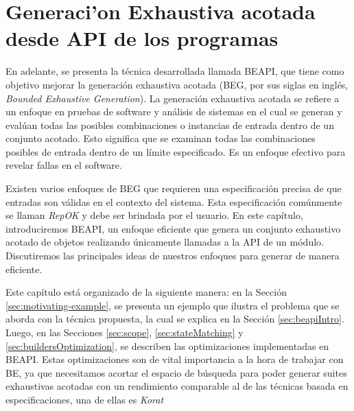 \chapter{Generaci'on Exhaustiva acotada desde API de los programas}
\label{cap:beapi}

En adelante, se presenta la técnica desarrollada llamada BEAPI, que tiene como
objetivo mejorar la generación exhaustiva acotada (BEG, por sus siglas en
inglés, \emph{Bounded Exhaustive Generation}).  
La generación exhaustiva acotada se refiere a un enfoque en pruebas de software
y análisis de sistemas en el cual se generan y evalúan todas las posibles combinaciones o instancias de entrada dentro de un conjunto acotado. 
Esto significa que se examinan todas las combinaciones posibles de entrada dentro de un límite especificado. 
Es un enfoque efectivo para revelar fallas en el software. 

Existen varios enfoques de BEG que requieren una especificación precisa de que entradas son válidas en el contexto del sistema. 
Esta especificación comúnmente se llaman \emph{RepOK} y debe ser brindada por el usuario.
En este capítulo, introduciremos BEAPI, un enfoque eficiente que genera un conjunto exhaustivo acotado de objetos realizando únicamente llamadas a la API de un módulo. 
Discutiremos las principales ideas de nuestros enfoques para generar de manera eficiente. 

 
Este capítulo está organizado de la siguiente manera: en la Sección \ref{sec:motivating-example}, 
se presenta un ejemplo que ilustra el problema que se aborda con la técnica propuesta, 
la cual se explica en la Sección \ref{sec:beapiIntro}. Luego, en las Secciones \ref{sec:scope}, \ref{sec:stateMatching} y
 \ref{sec:buildersOptimization}, se describen las optimizaciones implementadas en BEAPI. 
 Estas optimizaciones son de vital importancia a la hora de trabajar con BE, 
 ya que necesitamos acortar el espacio de búsqueda para poder generar suites exhaustivas acotadas con un 
 rendimiento comparable al de las técnicas basada en especificaciones, una de ellas es \emph{Korat}\cite{Boyapati02} 


